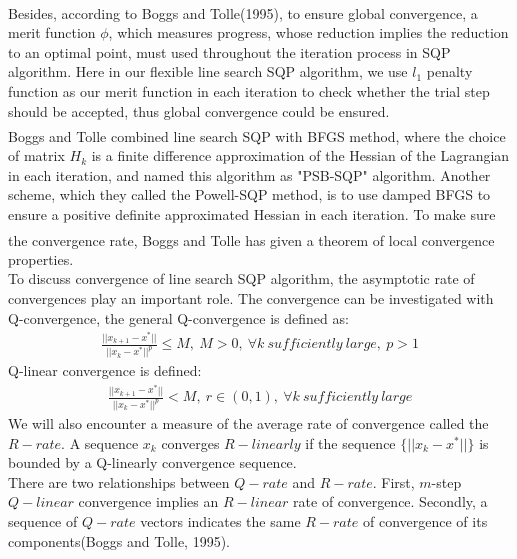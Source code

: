 \documentclass{article}
\newcommand{\upcite}[1]{\textsuperscript{\textsuperscript{\cite{#1}}}}
\begin{document}
\begin{spacing}{1.5}
Besides, according to Boggs and Tolle(1995)\upcite{Ref1}, to ensure global convergence, a merit function $\phi$, which measures progress, whose reduction implies the reduction to an optimal point, must used throughout the iteration process in SQP algorithm. Here in our flexible line search SQP algorithm, we use $l_1$ penalty function as our merit function in each iteration to check whether the trial step should be accepted, thus global convergence could be ensured.\\

Boggs and Tolle\upcite{Ref1} combined line search SQP with BFGS method, where the choice of matrix $H_k$ is a finite difference approximation of the Hessian of the Lagrangian in each iteration, and named this algorithm as "PSB-SQP" algorithm. Another scheme, which they called the Powell-SQP method, is to use damped BFGS to ensure a positive definite approximated Hessian in each iteration. To make sure the convergence rate, Boggs and Tolle\upcite{Ref1} has given a theorem of local convergence properties.\\

To discuss convergence of line search SQP algorithm, the asymptotic rate of convergences play an important role. The convergence can be investigated with Q-convergence, the general Q-convergence is defined as:
\begin{align}
\frac{||x_{k+1}-x^*||}{||x_k-x^*||^p}\le M,\ M>0,\ \forall k\ sufficiently\ large,\ p>1
\end{align}
Q-linear convergence is defined:
\begin{align}
\frac{||x_{k+1}-x^*||}{||x_k-x^*||^p}< M,\ r\in(0,1),\ \forall k\ sufficiently\ large
\end{align}
We will also encounter a measure of the average rate of convergence called the $R-rate$. A sequence ${x_k}$ converges $R-linearly$ if the sequence $\{||x_k-x^*||\}$ is bounded by a Q-linearly convergence sequence.\\

There are two relationships between $Q-rate$ and $R-rate$. First, $m$-step $Q-linear$ convergence implies an $R-linear$ rate of convergence. Secondly, a sequence of $Q-rate$ vectors indicates the same $R-rate$ of convergence of its components(Boggs and Tolle, 1995).



\end{spacing}
\end{document}
